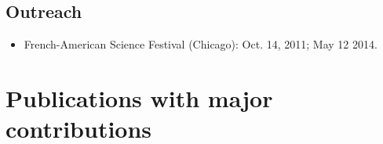 \documentclass[a4paper,11pt]{article}
\begin{document}
\subsection*{Outreach}
\begin{itemize}
 \item French-American Science Festival (Chicago): Oct. 14, 2011; May 12 2014.
\end{itemize}





\section*{Publications with major contributions}
\end{document}

